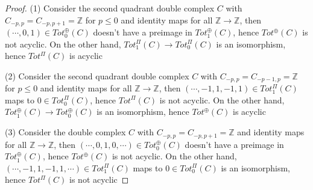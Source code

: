 \documentclass{article}
\theoremstyle{definition}
\theoremstyle{remark}
\theoremstyle{definition}
\begin{document}
\begin{proof}
(1) Consider the second quadrant double complex $C$ with $C_{-p,p}=C_{-p,p+1}=\mathbb Z$ for $p\leq0$ and identity maps for all $\mathbb Z\to\mathbb Z$, then $(\cdots,0,1)\in Tot^\oplus_0(C)$ doesn't have a preimage in $Tot^\oplus_1(C)$, hence $Tot^\oplus(C)$ is not acyclic. On the other hand, $Tot^\Pi_1(C)\to Tot^\Pi_0(C)$ is an isomorphism, hence $Tot^\Pi(C)$ is acyclic
\begin{center}
\end{center}
(2) Consider the second quadrant double complex $C$ with $C_{-p,p}=C_{-p-1,p}=\mathbb Z$ for $p\leq0$ and identity maps for all $\mathbb Z\to\mathbb Z$, then $(\cdots,-1,1,-1,1)\in Tot^\Pi_1(C)$ maps to $0\in Tot^\Pi_0(C)$, hence $Tot^\Pi(C)$ is not acyclic. On the other hand, $Tot^\oplus_1(C)\to Tot^\oplus_0(C)$ is an isomorphism, hence $Tot^\oplus(C)$ is acyclic
\begin{center}
\end{center}
(3) Consider the double complex $C$ with $C_{-p,p}=C_{-p,p+1}=\mathbb Z$ and identity maps for all $\mathbb Z\to\mathbb Z$, then $(\cdots,0,1,0,\cdots)\in Tot^\oplus_0(C)$ doesn't have a preimage in $Tot^\oplus_1(C)$, hence $Tot^\oplus(C)$ is not acyclic. On the other hand, $(\cdots,-1,1,-1,1,\cdots)\in Tot^\Pi_1(C) $ maps to $0\in Tot^\Pi_0(C)$ is an isomorphism, hence $Tot^\Pi(C)$ is not acyclic

\end{proof}
\end{document}
